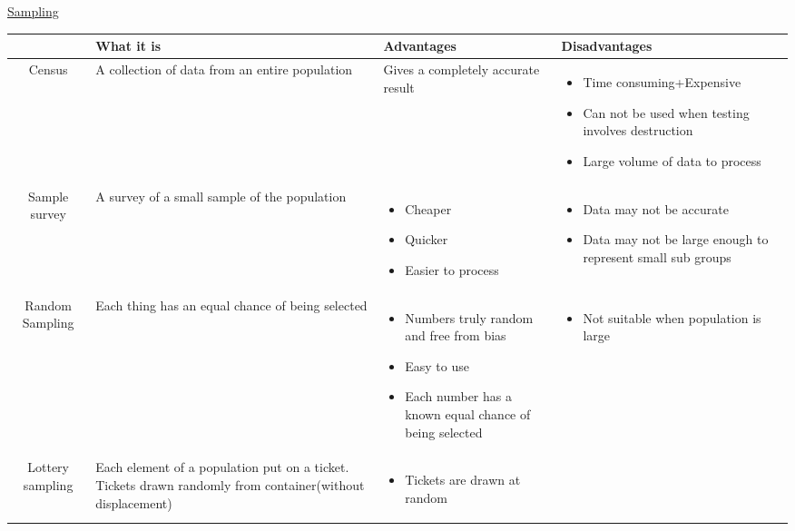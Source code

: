 \documentclass{article}[18pt]
\begin{document}
\begin{center}
\underline{\huge Sampling}
\end{center}
\begin{tabularx}{\textwidth}{|c|X|X|X|}
\hline
&What it is&Advantages&Disadvantages\\
\hline
Census&A collection of data from an entire population&Gives a completely accurate result&
\begin{itemize}[noitemsep,topsep=0pt,leftmargin=*]
\item Time consuming+Expensive
\item Can not be used when testing involves destruction
\item Large volume of data to process
\end{itemize}\\
\hline
Sample survey&A survey of a small sample of the population&
\begin{itemize}[noitemsep,topsep=0pt,leftmargin=*]
\item Cheaper
\item Quicker
\item Easier to process
\end{itemize}&
\begin{itemize}[noitemsep,topsep=0pt,leftmargin=*]
\item Data may not be accurate
\item Data may not be large enough to represent small sub groups
\end{itemize}\\
\hline
Random Sampling&Each thing has an equal chance of being selected&
\begin{itemize}[noitemsep,topsep=0pt,leftmargin=*]
\item Numbers truly random and free from bias
\item Easy to use
\item Each number has a known equal chance of being selected
\end{itemize}&
\begin{itemize}[noitemsep,topsep=0pt,leftmargin=*]
\item Not suitable when population is large
\end{itemize}\\
\hline
Lottery sampling&Each element of a population put on a ticket. Tickets drawn randomly from container(without displacement)&
\begin{itemize}[noitemsep,topsep=0pt,leftmargin=*]
\item Tickets are drawn at random

\end{itemize}
\end{tabularx}
\end{document}
